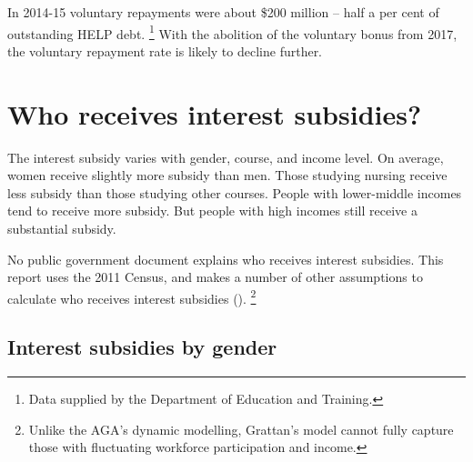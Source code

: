 \documentclass[embargoed]{grattan}
\begin{document}
In 2014-15 voluntary repayments were about \$200 million -- half a per cent of outstanding \gls{HELP} debt.%
\footnote{Data supplied by the Department of Education and Training.} With the abolition of the voluntary bonus from 2017, the voluntary repayment rate is likely to decline further.

\chapter{Who receives interest subsidies?}\label{chap:3-who-receives-interest-subsidies}

The interest subsidy varies with gender, course, and income level. On average, women receive slightly more subsidy than men. Those studying nursing receive less subsidy than those studying other courses. People with lower-middle incomes tend to receive more subsidy. But people with high incomes still receive a substantial subsidy. 

No public government document explains who receives interest subsidies. This report uses the 2011 Census, and makes a number of other assumptions to calculate who receives interest subsidies ().%
\footnote{Unlike the \gls{AGA}'s dynamic modelling, Grattan's model cannot fully capture those with fluctuating workforce participation and income.}

\section{Interest subsidies by gender}\label{sec:interest-subsidies-by-gender}
\end{document}
